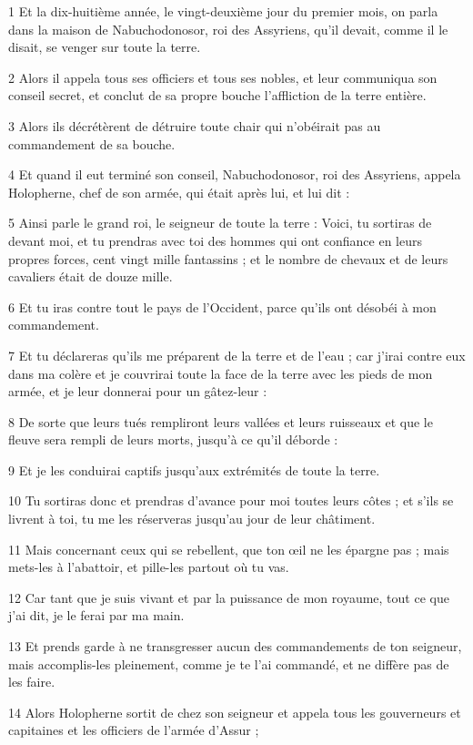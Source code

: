\par 1 Et la dix-huitième année, le vingt-deuxième jour du premier mois, on parla dans la maison de Nabuchodonosor, roi des Assyriens, qu'il devait, comme il le disait, se venger sur toute la terre.
\par 2 Alors il appela tous ses officiers et tous ses nobles, et leur communiqua son conseil secret, et conclut de sa propre bouche l'affliction de la terre entière.
\par 3 Alors ils décrétèrent de détruire toute chair qui n'obéirait pas au commandement de sa bouche.
\par 4 Et quand il eut terminé son conseil, Nabuchodonosor, roi des Assyriens, appela Holopherne, chef de son armée, qui était après lui, et lui dit :
\par 5 Ainsi parle le grand roi, le seigneur de toute la terre : Voici, tu sortiras de devant moi, et tu prendras avec toi des hommes qui ont confiance en leurs propres forces, cent vingt mille fantassins ; et le nombre de chevaux et de leurs cavaliers était de douze mille.
\par 6 Et tu iras contre tout le pays de l'Occident, parce qu'ils ont désobéi à mon commandement.
\par 7 Et tu déclareras qu'ils me préparent de la terre et de l'eau ; car j'irai contre eux dans ma colère et je couvrirai toute la face de la terre avec les pieds de mon armée, et je leur donnerai pour un gâtez-leur :
\par 8 De sorte que leurs tués rempliront leurs vallées et leurs ruisseaux et que le fleuve sera rempli de leurs morts, jusqu'à ce qu'il déborde :
\par 9 Et je les conduirai captifs jusqu'aux extrémités de toute la terre.
\par 10 Tu sortiras donc et prendras d'avance pour moi toutes leurs côtes ; et s'ils se livrent à toi, tu me les réserveras jusqu'au jour de leur châtiment.
\par 11 Mais concernant ceux qui se rebellent, que ton œil ne les épargne pas ; mais mets-les à l'abattoir, et pille-les partout où tu vas.
\par 12 Car tant que je suis vivant et par la puissance de mon royaume, tout ce que j'ai dit, je le ferai par ma main.
\par 13 Et prends garde à ne transgresser aucun des commandements de ton seigneur, mais accomplis-les pleinement, comme je te l'ai commandé, et ne diffère pas de les faire.
\par 14 Alors Holopherne sortit de chez son seigneur et appela tous les gouverneurs et capitaines et les officiers de l'armée d'Assur ;
